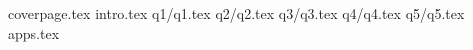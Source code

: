 \documentclass[12pt]{extarticle}
\begin{document}
    {coverpage.tex}
    {intro.tex}
    {q1/q1.tex}
    {q2/q2.tex}
    {q3/q3.tex}
    {q4/q4.tex}
    {q5/q5.tex}
    {apps.tex}
\end{document}
